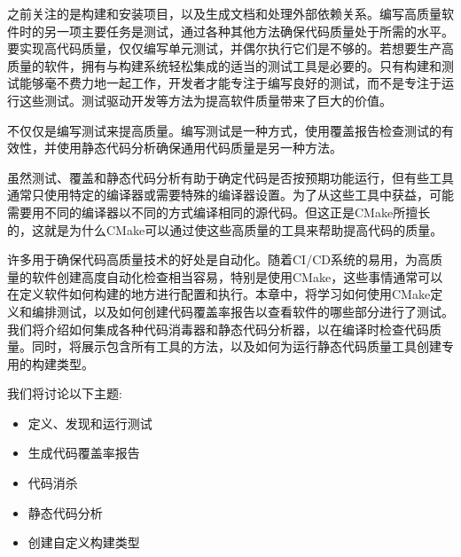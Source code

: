之前关注的是构建和安装项目，以及生成文档和处理外部依赖关系。编写高质量软件时的另一项主要任务是测试，通过各种其他方法确保代码质量处于所需的水平。要实现高代码质量，仅仅编写单元测试，并偶尔执行它们是不够的。若想要生产高质量的软件，拥有与构建系统轻松集成的适当的测试工具是必要的。只有构建和测试能够毫不费力地一起工作，开发者才能专注于编写良好的测试，而不是专注于运行这些测试。测试驱动开发等方法为提高软件质量带来了巨大的价值。

不仅仅是编写测试来提高质量。编写测试是一种方式，使用覆盖报告检查测试的有效性，并使用静态代码分析确保通用代码质量是另一种方法。

虽然测试、覆盖和静态代码分析有助于确定代码是否按预期功能运行，但有些工具通常只使用特定的编译器或需要特殊的编译器设置。为了从这些工具中获益，可能需要用不同的编译器以不同的方式编译相同的源代码。但这正是CMake所擅长的，这就是为什么CMake可以通过使这些高质量的工具来帮助提高代码的质量。

许多用于确保代码高质量技术的好处是自动化。随着CI/CD系统的易用，为高质量的软件创建高度自动化检查相当容易，特别是使用CMake，这些事情通常可以在定义软件如何构建的地方进行配置和执行。本章中，将学习如何使用CMake定义和编排测试，以及如何创建代码覆盖率报告以查看软件的哪些部分进行了测试。我们将介绍如何集成各种代码消毒器和静态代码分析器，以在编译时检查代码质量。同时，将展示包含所有工具的方法，以及如何为运行静态代码质量工具创建专用的构建类型。

我们将讨论以下主题:

\begin{itemize}
\item 
定义、发现和运行测试

\item 
生成代码覆盖率报告

\item 
代码消杀

\item 
静态代码分析

\item 
创建自定义构建类型
\end{itemize}
















